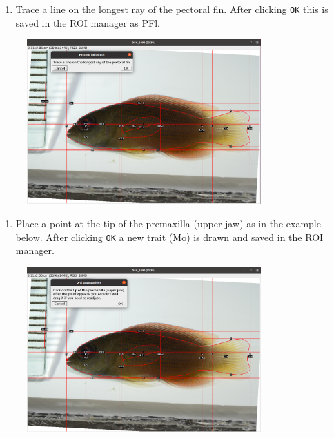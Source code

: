\documentclass[
  letterpaper,
  DIV=11,
  numbers=noendperiod,
  oneside]{scrreprt}
\providecommand{\tightlist}{%
  \setlength{\itemsep}{0pt}\setlength{\parskip}{0pt}}\usepackage{longtable,booktabs,array}
\begin{document}
\begin{enumerate}
\def\labelenumi{\arabic{enumi}.}
\setcounter{enumi}{10}
\tightlist
\item
  Trace a line on the longest ray of the pectoral fin. After clicking
  \texttt{OK} this is saved in the ROI manager as PFl.
\end{enumerate}

\begin{figure}

{\centering \includegraphics[width=0.8\textwidth,height=\textheight]{./images/screenshots/pectoral_fin_length.png}

}

\end{figure}

\begin{enumerate}
\def\labelenumi{\arabic{enumi}.}
\setcounter{enumi}{11}
\tightlist
\item
  Place a point at the tip of the premaxilla (upper jaw) as in the
  example below. After clicking \texttt{OK} a new trait (Mo) is drawn
  and saved in the ROI manager.
\end{enumerate}

\begin{figure}

{\centering \includegraphics[width=0.8\textwidth,height=\textheight]{./images/screenshots/tip_upper_jaw.png}

}

\end{figure}
\end{document}
